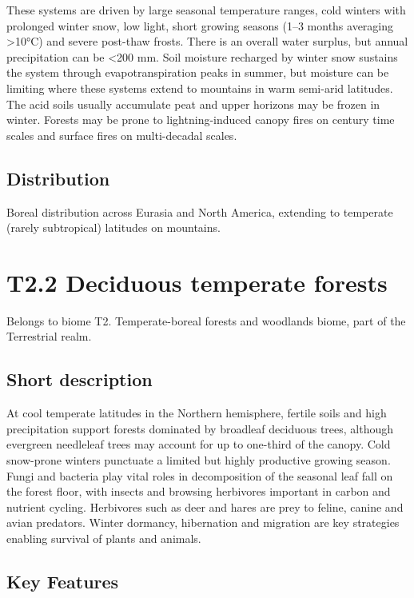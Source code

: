 \documentclass[
  letterpaper,
  DIV=11,
  numbers=noendperiod]{scrartcl}
\begin{document}
These systems are driven by large seasonal temperature ranges, cold
winters with prolonged winter snow, low light, short growing seasons
(1--3 months averaging \textgreater10°C) and severe post-thaw frosts.
There is an overall water surplus, but annual precipitation can be
\textless200 mm. Soil moisture recharged by winter snow sustains the
system through evapotranspiration peaks in summer, but moisture can be
limiting where these systems extend to mountains in warm semi-arid
latitudes. The acid soils usually accumulate peat and upper horizons may
be frozen in winter. Forests may be prone to lightning-induced canopy
fires on century time scales and surface fires on multi-decadal scales.

\subsection{Distribution}\label{distribution-73}

Boreal distribution across Eurasia and North America, extending to
temperate (rarely subtropical) latitudes on mountains.

\section{T2.2 Deciduous temperate
forests}\label{t2.2-deciduous-temperate-forests}

Belongs to biome T2. Temperate-boreal forests and woodlands biome, part
of the Terrestrial realm.

\subsection{Short description}\label{short-description-74}

At cool temperate latitudes in the Northern hemisphere, fertile soils
and high precipitation support forests dominated by broadleaf deciduous
trees, although evergreen needleleaf trees may account for up to
one-third of the canopy. Cold snow-prone winters punctuate a limited but
highly productive growing season. Fungi and bacteria play vital roles in
decomposition of the seasonal leaf fall on the forest floor, with
insects and browsing herbivores important in carbon and nutrient
cycling. Herbivores such as deer and hares are prey to feline, canine
and avian predators. Winter dormancy, hibernation and migration are key
strategies enabling survival of plants and animals.

\subsection{Key Features}\label{key-features-74}
\end{document}
